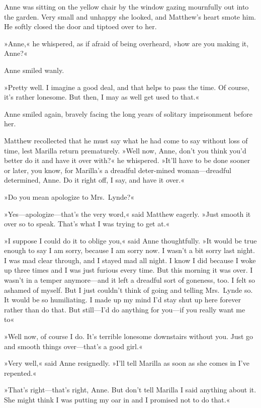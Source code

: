 Anne was sitting on the yellow chair by the window gazing mournfully out into the garden. Very small and unhappy she looked, and Matthew's heart smote him. He softly closed the door and tiptoed over to her.

»Anne,« he whispered, as if afraid of being overheard, »how are you making it, Anne?«

Anne smiled wanly.

»Pretty well. I imagine a good deal, and that helps to pass the time. Of course, it's rather lonesome. But then, I may as well get used to that.«

Anne smiled again, bravely facing the long years of solitary imprisonment before her.

Matthew recollected that he must say what he had come to say without loss of time, lest Marilla return prematurely. »Well now, Anne, don't you think you'd better do it and have it over with?« he whispered. »It'll have to be done sooner or later, you know, for Marilla's a dreadful deter-mined woman—dreadful determined, Anne. Do it right off, I say, and have it over.«

»Do you mean apologize to Mrs.~Lynde?«

»Yes—apologize—that's the very word,« said Matthew eagerly. »Just smooth it over so to speak. That's what I was trying to get at.«

»I suppose I could do it to oblige you,« said Anne thoughtfully. »It would be true enough to say I am sorry, because I am sorry now. I wasn't a bit sorry last night. I was mad clear through, and I stayed mad all night. I know I did because I woke up three times and I was just furious every time. But this morning it was over. I wasn't in a temper anymore—and it left a dreadful sort of goneness, too. I felt so ashamed of myself. But I just couldn't think of going and telling Mrs.~Lynde so. It would be so humiliating. I made up my mind I'd stay shut up here forever rather than do that. But still—I'd do anything for you—if you really want me to\longdash«

»Well now, of course I do. It's terrible lonesome downstairs without you. Just go and smooth things over—that's a good girl.«

»Very well,« said Anne resignedly. »I'll tell Marilla as soon as she comes in I've repented.«

»That's right—that's right, Anne. But don't tell Marilla I said anything about it. She might think I was putting my oar in and I promised not to do that.«

